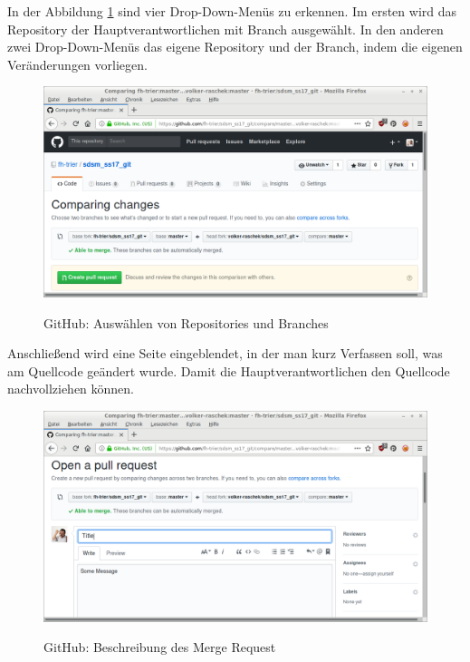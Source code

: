 In der Abbildung \ref{img:github-pull-request-select-branches} sind vier Drop-Down-Menüs zu erkennen. Im ersten wird das Repository der Hauptverantwortlichen mit Branch ausgewählt. In den anderen zwei Drop-Down-Menüs das eigene Repository und der Branch, indem die eigenen Veränderungen vorliegen.

\begin{figure}[H]
  \centering
  \includegraphics[width=1\textwidth]{images//pull-request2.png}
  \label{img:github-pull-request-select-branches}
  \caption{GitHub: Auswählen von Repositories und Branches}
\end{figure}

Anschließend wird eine Seite eingeblendet, in der man kurz Verfassen soll, was am Quellcode geändert wurde. Damit die Hauptverantwortlichen den Quellcode nachvollziehen können.

\begin{figure}[H]
  \centering
  \includegraphics[width=1\textwidth]{images//pull-request3.png}
  \label{img:github-pull-request-description}
  \caption{GitHub: Beschreibung des Merge Request}
\end{figure}

